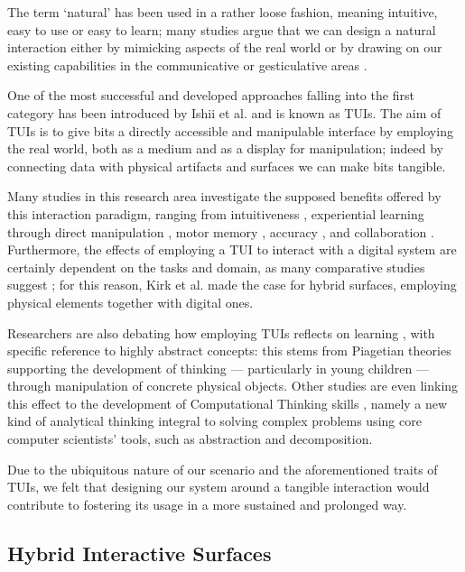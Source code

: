 The term `natural' has been used in a rather loose fashion, meaning intuitive, easy to use or easy to learn; many studies argue that we can design a natural interaction either by mimicking aspects of the real world \cite{Jacob:2008dj} or by drawing on our existing capabilities in the communicative or gesticulative areas \cite{Wigdor:2011:BNW:1995309}.

One of the most successful and developed approaches falling into the first category has been introduced by Ishii et al. \cite{Ishii:1997gy} and is known as \acp{TUI}. The aim of \acp{TUI} is to give bits a directly accessible and manipulable interface by employing the real world, both as a medium and as a display for manipulation; indeed by connecting data with physical artifacts and surfaces we can make bits tangible. 

Many studies in this research area investigate the supposed benefits offered by this interaction paradigm, ranging from intuitiveness \cite{Ishii:1997gy}, experiential learning through direct manipulation \cite{Manches:2009kg, Parkes:2008bu}, motor memory \cite{Weiss:2009ct}, accuracy \cite{Muller:2014kx}, and collaboration \cite{Subramanian:2007kx}. Furthermore, the effects of employing a \ac{TUI} to interact with a digital system are certainly dependent on the tasks and domain, as many comparative studies suggest \cite{Weiss:2009ct, Muller:2014kx, Hancock:2009bg}; for this reason, Kirk et al. \cite{Kirk:2009ue} made the case for hybrid surfaces, employing physical elements together with digital ones.

Researchers are also debating how employing \acp{TUI} reflects on learning \cite{Horn:2009be,Marshall:2007dr,Antle:2013ho}, with specific reference to highly abstract concepts: this stems from Piagetian theories supporting the development of thinking --- particularly in young children --- through manipulation of concrete physical objects. Other studies \cite{Wang:2014jy,Horn:2011ch} are even linking this effect to the development of Computational Thinking skills \cite{Wing:2006iz}, namely a new kind of analytical thinking integral to solving complex problems using core computer scientists' tools, such as abstraction and decomposition.

Due to the ubiquitous nature of our scenario and the aforementioned traits of \acp{TUI}, we felt that designing our system around a tangible interaction would contribute to fostering its usage in a more sustained and prolonged way.

\subsection{Hybrid Interactive Surfaces}

